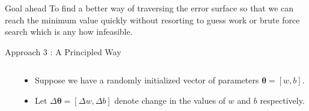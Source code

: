 \documentclass[10pt, aspectratio=169]{beamer}
\begin{document}
\begin{frame}
\begin{block}{ \hspace{0.1cm} Goal ahead}
To find a better way of traversing the error surface so that we can reach the minimum value quickly without resorting to guess work or brute force search which is any how infeasible.
\end{block}
\end{frame}


\begin{frame}{Approach 3 : A Principled Way}

\begin{columns}

\begin{column}{0.5\textwidth}
\end{column}

\begin{column}{0.5\textwidth}
\begin{itemize}
\item<1-> Suppose we have a randomly initialized vector of parameters $\symbf{\theta} = \left[ w, b \right]$.

\item<2-> Let $\Delta\symbf{\theta} = \left[ \Delta w, \Delta b \right]$ denote change in the values of $w$ and $b$ respectively. 


\end{itemize}
\end{column}
\end{columns}
\end{frame}
\end{document}
